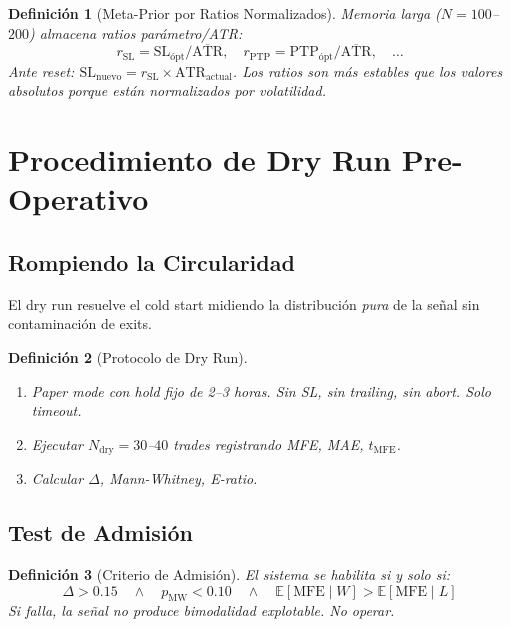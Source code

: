 \documentclass[11pt,a4paper]{article}
\newtheorem{definition}{Definici\'on}[section]
\newcommand{\E}{\mathbb{E}}
\begin{document}
\begin{definition}[Meta-Prior por Ratios Normalizados]
Memoria larga ($N = 100$--$200$) almacena ratios par\'ametro/ATR:
\begin{equation}
r_{\text{SL}} = \text{SL}_{\text{\'opt}} / \overline{\text{ATR}}, \quad
r_{\text{PTP}} = \text{PTP}_{\text{\'opt}} / \overline{\text{ATR}}, \quad \ldots
\end{equation}
Ante reset: $\text{SL}_{\text{nuevo}} = r_{\text{SL}} \times \text{ATR}_{\text{actual}}$.
Los ratios son m\'as estables que los valores absolutos porque est\'an
normalizados por volatilidad.
\end{definition}


\section{Procedimiento de Dry Run Pre-Operativo}
\label{sec:dryrun}

\subsection{Rompiendo la Circularidad}

El dry run resuelve el cold start midiendo la distribuci\'on
\textit{pura} de la se\~nal sin contaminaci\'on de exits.

\begin{definition}[Protocolo de Dry Run]
\begin{enumerate}[leftmargin=1.5em]
\item Paper mode con hold fijo de 2--3 horas. Sin SL, sin trailing,
  sin abort. Solo timeout.
\item Ejecutar $N_{\text{dry}} = 30$--$40$ trades registrando
  MFE, MAE, $t_{\text{MFE}}$.
\item Calcular $\Delta$, Mann-Whitney, E-ratio.
\end{enumerate}
\end{definition}

\subsection{Test de Admisi\'on}

\begin{definition}[Criterio de Admisi\'on]
El sistema se habilita si y solo si:
\begin{equation}
\boxed{\Delta > 0.15 \quad \wedge \quad p_{\text{MW}} < 0.10
  \quad \wedge \quad \E[\text{MFE} \mid W] > \E[\text{MFE} \mid L]}
\end{equation}
Si falla, la se\~nal no produce bimodalidad explotable. No operar.
\end{definition}
\end{document}
